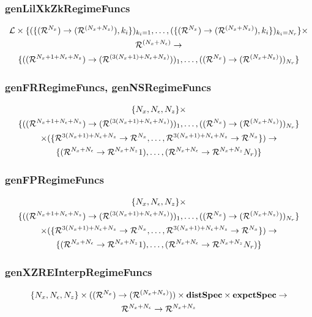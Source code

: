 \documentclass[tikz]{beamer}
\begin{document}
\begin{frame}
\frametitle{genLilXkZkRegimeFuncs}
\label{sec:genlilxkzkregimefunc}
{\small
\begin{gather*}
\linMod \times \{(\{  \bigXFuncSig, k_i \})_{k_i=1},\ldots,(\{  \bigXFuncSig, k_i \})_{k_i=\numR}\} \times\\ \Rn{(\numX+\numEps)} \rightarrow\\
\{(\lilXRegimeFuncSig)_1,\ldots,(\xzFuncGuessSig)_{\numR}\}
\end{gather*}
}





\end{frame}


\begin{frame}
\frametitle{genFRRegimeFuncs, genNSRegimeFuncs}
\label{sec:genfrregimefunc}



{\small
\begin{gather*}
\{\numX,\numEps,\numZ\}\times\\
\{(\lilXRegimeFuncSig)_1,\ldots,(\xzFuncGuessSig)_{\numR}\}  \\
 \times (\eqnRegimeFuncSig )\rightarrow\\
\frfpnsRegimeFuncSig
\end{gather*}
}








\end{frame}




\begin{frame}
\frametitle{genFPRegimeFuncs}
\label{sec:genfpregimefunc}




{\small
\begin{gather*}
\{\numX,\numEps,\numZ\}\times\\
\{(\lilXRegimeFuncSig)_1,\ldots,(\xzFuncGuessSig)_{\numR}\}  \\
 \times (\eqnRegimeFuncSig )\rightarrow\\
\frfpnsRegimeFuncSig
\end{gather*}
}




\end{frame}

\begin{frame}
\frametitle{genXZREInterpRegimeFuncs}
\label{sec:genfpfunc}
\begin{gather*}
\{\numX,\numEps,\numZ\}\times(\xzFuncGuessSig)\times \dstSpec \times  \expctSpec   \rightarrow\\
\frfpnsFuncSig
\end{gather*}



\end{frame}
\end{document}
